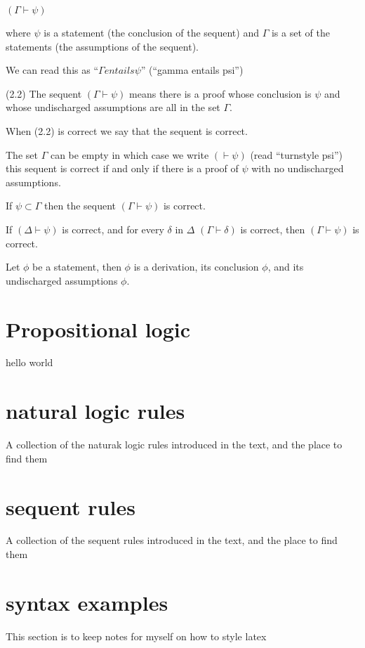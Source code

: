 \documentclass[a4paper, titlepage]{report}
\begin{document}
  $(\Gamma \vdash \psi)$

  where $\psi$ is a statement (the conclusion of the sequent) and $\Gamma$ is a set of the statements (the assumptions of the sequent).

  We can read this as  ``$\Gamma entails \psi$'' (``gamma entails psi'')

(2.2) The sequent $(\Gamma \vdash \psi)$ means
  there is a proof whose conclusion is $\psi$ and whose undischarged assumptions are all in the set $\Gamma$.

When (2.2) is correct we say that the sequent is correct.

The set $\Gamma$ can be empty in which case we write $(\vdash \psi)$ (read ``turnstyle psi'')
this sequent is correct if and only if there is a proof of $\psi$ with no undischarged assumptions.

\bigskip

  If $\psi \subset \Gamma$ then the sequent $(\Gamma \vdash \psi)$ is correct.

  If $(\Delta \vdash \psi)$ is correct,
  and for every $\delta$ in $\Delta$ $(\Gamma \vdash \delta)$ is correct,
  then $(\Gamma \vdash \psi)$ is correct.

  Let $\phi$ be a statement, then
    $\phi$
  is a derivation, its conclusion $\phi$, and its undischarged assumptions $\phi$.



\chapter{Propositional logic}

hello world


\chapter{natural logic rules}
A collection of the naturak logic rules introduced in the text, and the place to find them

\chapter{sequent rules}
A collection of the sequent rules introduced in the text, and the place to find them

\chapter{syntax examples}
This section is to keep notes for myself on how to style latex
\end{document}
